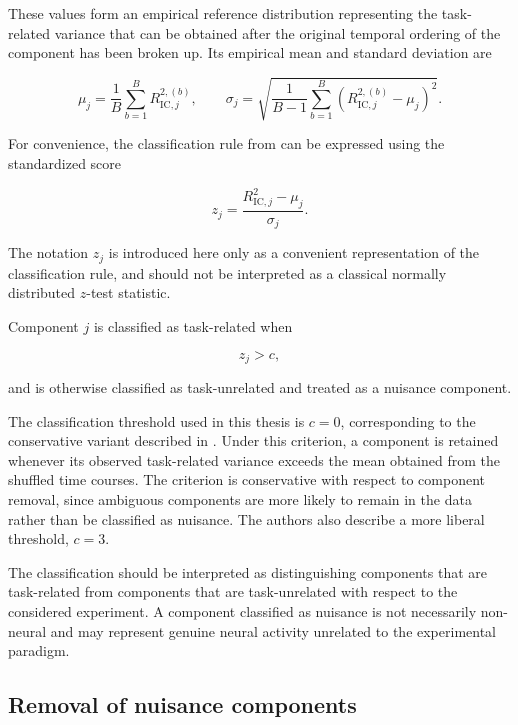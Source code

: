 \documentclass[english]{pwr_wmat_praca_dyplomowa}
\theoremstyle{definition}
\theoremstyle{remark}
\begin{document}
These values form an empirical reference distribution representing the task-related variance that can be obtained after the original temporal ordering of the component has been broken up. Its empirical mean and standard deviation are

\begin{equation}
    \mu_j = \frac{1}{B} \sum_{b=1}^{B} R_{\mathrm{IC},j}^{2,(b)}, \qquad
    \sigma_j =\sqrt{\frac{1}{B-1} \sum_{b=1}^{B} \left(R_{\mathrm{IC},j}^{2,(b)}-\mu_j \right)^2}.
\end{equation}

For convenience, the classification rule from \cite{glm-denoise} can be expressed using the standardized score

\begin{equation}
    z_j = \frac{R^2_{\mathrm{IC},j} - \mu_j}{\sigma_j}.
\end{equation}

The notation $z_j$ is introduced here only as a convenient representation of the classification rule, and should not be interpreted as a classical normally distributed $z$-test statistic.

Component $j$ is classified as task-related when

\begin{equation}
    z_j > c,
    \label{eq:classification-criterion}
\end{equation}

and is otherwise classified as task-unrelated and treated as a nuisance component.

The classification threshold used in this thesis is $c=0$, corresponding to the conservative variant described in \cite{glm-denoise}. Under this criterion, a component is retained whenever its observed task-related variance exceeds the mean obtained from the shuffled time courses. The criterion is conservative with respect to component removal, since ambiguous components are more likely to remain in the data rather than be classified as nuisance. The authors also describe a more liberal threshold, $c=3$.

The classification should be interpreted as distinguishing components that are task-related from components that are task-unrelated with respect to the considered experiment. A component classified as nuisance is not necessarily non-neural and may represent genuine neural activity unrelated to the experimental paradigm.

\subsection{Removal of nuisance components}
\end{document}
